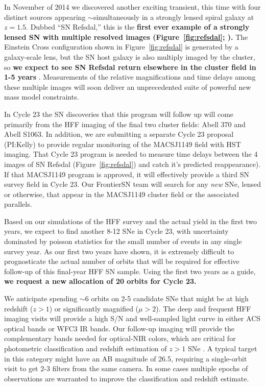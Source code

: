 \documentclass[12pt]{article}
\begin{document}
In November of 2014 we discovered another exciting transient, this
time with four distinct sources appearing $\sim$simultaneously in a
strongly lensed spiral galaxy at $z=1.5$.  Dubbed ``SN Refsdal,'' this
is the {\bf first ever example of a strongly lensed SN with multiple
  resolved images (Figure~\ref{fig:refsdal}; \citealt{Kelly:2015}).}
The Einstein Cross configuration shown in Figure~\ref{fig:refsdal} is
generated by a galaxy-scale lens, but the SN host galaxy is also
multiply imaged by the cluster, so {\bf we expect to see SN Refsdal
  return elsewhere in the cluster field in 1-5 years}
\citep{Oguri:2015,Sharon:2015}.  Measurements of the relative
magnifications and time delays among these multiple images will soon
deliver an unprecedented suite of powerful new mass model constraints.



%
%
\describeobservations   %

In Cycle 23 the SN discoveries that this program will follow up will
come primarily from the HFF imaging of the final two cluster fields:
Abell 370 and Abell S1063. In addition, we are submitting a separate
Cycle 23 proposal (PI:Kelly) to provide regular monitoring of the
MACSJ1149 field with HST imaging.  That Cycle 23 program is needed to
measure time delays between the 4 images of SN Refsdal
(Figure~\ref{fig:refsdal}) and catch it's predicted reappearance).  If
that MACSJ1149 program is approved, it will effectively provide a
third SN survey field in Cycle 23. Our FrontierSN team will search
for any {\it new} SNe, lensed or otherwise, that appear in the
MACSJ1149 cluster field or the associated parallels.

Based on our simulations of the HFF survey and the actual yield in the
first two years, we expect to find another 8-12 SNe in Cycle 23, with
uncertainty dominated by poisson statistics for the small number of
events in any single survey year.  As our first two years have shown,
it is extremely difficult to prognosticate the actual number of orbits
that will be required for effective follow-up of this final-year HFF
SN sample.  Using the first two years as a guide, {\bf we request a new
allocation  of 20 orbits for Cycle 23.}

We anticipate spending $\sim$6 orbits on 2-5 candidate SNe that might
be at high redshift ($z>1$) or significantly magnified ($\mu>2$).  The
deep and frequent HFF imaging visits will provide a high S/N and
well-sampled light curve in either ACS optical bands or WFC3 IR bands.
Our follow-up imaging will provide the complementary bands needed for
optical-NIR colors, which are critical for photometric classification
and redshift estimation of $z>1$ SNe \citep{Riess:2004a,Rodney:2012}.
A typical target in this category might have an AB magnitude of 26.5,
requiring a single-orbit visit to get 2-3 filters from the same
camera.  In some cases multiple epochs of observations are warranted
to improve the classification and redshift estimate.
\end{document}
